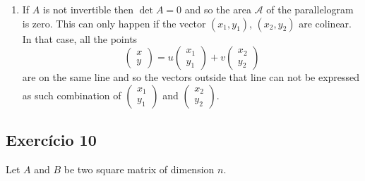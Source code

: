 \begin{enumerate}
\item If $A$ is not invertible then $\det A = 0$ and so the area
  $\mathscr A$ of the parallelogram is zero. This can only happen if the vector
  $(x_1, y_1)$, $(x_2,y_2)$ are colinear. In that case, all the points
  $$\begin{pmatrix} x \\ y \end{pmatrix} =
  {u \begin{pmatrix} x_1 \\ y_1 \end{pmatrix}} +
  {v \begin{pmatrix} x_2 \\ y_2 \end{pmatrix}}$$
  are on the same line and so the vectors outside that line can not be expressed
  as such combination of $\begin{pmatrix} x_1 \\ y_1 \end{pmatrix}$ and
  $\begin{pmatrix} x_2 \\ y_2 \end{pmatrix}$.
\end{enumerate}

\subsection*{Exercício 10}

Let $A$ and $B$ be two square matrix of dimension $n$.

